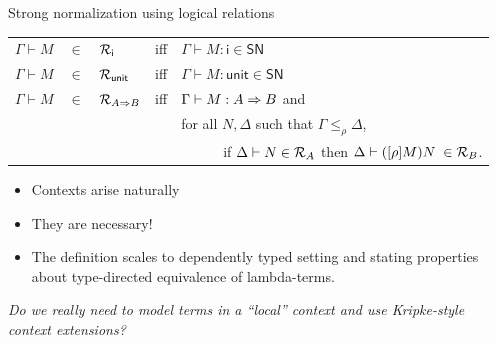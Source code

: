 \documentclass{beamer}
\newcommand{\unit}{\textsf{unit}}
\newcommand{\base}{\textsf{i}}
\newcommand{\SN}{\mathsf{SN}}
\begin{document}
\begin{frame}{Strong normalization using logical relations}



\pause
\begin{definition}
\mbox{}
\begin{tabular}{l@{~}c@{~}lll}
  $\Gamma \vdash M$ & $\in$ & $\R_{\base}$ & iff & %
                                               $\Gamma \vdash M : \base \in \SN $\\
  $\Gamma \vdash M$ & $\in$ & $\R_{\unit}$ & iff & %
                                               $\Gamma \vdash M : \unit \in \SN $\\
  $\Gamma \vdash M$ & $\in$ & $\mathcal{R}_{A\Rightarrow B}$ & iff &
$ \Gamma\vdash M\mathrel{:} {A\Rightarrow B}$ and  \\
  & & & & for all $N,\Delta$ such that
  $\Gamma \leq_\rho \Delta$,  \\
  & & & & ~~~~~~if $\Delta \vdash N\in \mathcal{R}_{A} $ then
  $\Delta \vdash ([\rho]M) N\;\in \mathcal{R}_{B} $.

\end{tabular}
\end{definition}
\vspace{1ex}
\begin{itemize}
\item Contexts arise naturally %
\item They are necessary! 
\item The definition scales to dependently typed setting and stating
  properties about type-directed equivalence of lambda-terms.
\end{itemize}
\pause
\vspace{1ex}
{\centering \textit {Do we really need to model terms in a ``local'' context and
  use Kripke-style context extensions?}}
\pause

\end{frame}
\end{document}
